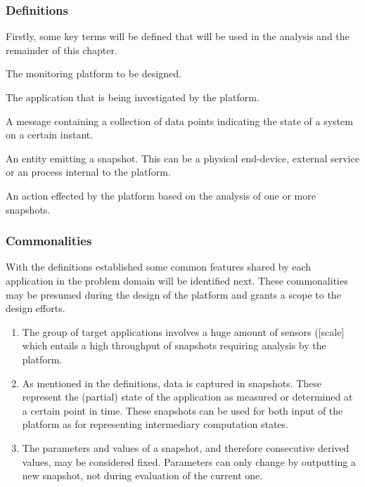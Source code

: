 \subsubsection*{Definitions}
Firstly, some key terms will be defined that will be used in the analysis and the remainder of this chapter.
\begin{description}[style=nextline]
\nospace
\item[Platform] The monitoring platform to be designed.
\item[Application] The application that is being investigated by the platform.
\item[Snapshot] A message containing a collection of data points indicating the state of a system on a certain instant.
\item[Source] An entity emitting a snapshot. This can be a physical end-device, external service or an process internal to the platform.
\item[Consequence] An action effected by the platform based on the analysis of one or more snapshots.
\end{description}
\subsubsection*{Commonalities}
With the definitions established some common features shared by each application in the problem domain will be identified next. These commonalities may be presumed during the design of the platform and grants a scope to the design efforts.
\begin{enumerate}[label=C\archid .\arabic*]
\nospace
\item \label{c:scale_sensor} The group of target applications involves a huge amount of sensors ([scale] which entails a high throughput of snapshots requiring analysis by the platform.
\item \label{c:snapshot} As mentioned in the definitions, data is captured in snapshots. These represent the (partial) state of the application as measured or determined at a certain point in time. These snapshots can be used for both input of the platform as for representing intermediary computation states.
\item \label{c:snapshot_transformation} The parameters and values of a snapshot, and therefore consecutive derived values, may be considered fixed. Parameters can only change by outputting a new snapshot, not during evaluation of the current one.
\end{enumerate}
